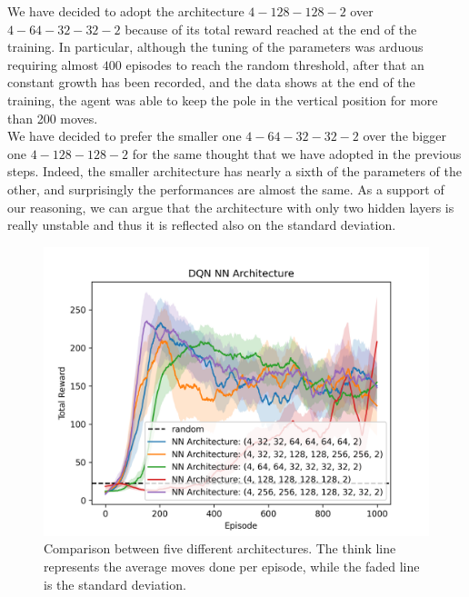 \documentclass{article}
\begin{document}
   We have decided to adopt the architecture $4-128-128-2$ over $4-64-32-32-2$ because of its total reward reached at the end of the training. 
   In particular, although the tuning of the parameters was arduous requiring almost $400$ episodes to reach the random threshold, 
   after that an constant growth has been recorded, and the data shows at the end of the training, the agent was able to keep the pole in the vertical position for more than 200 moves.\\
   We have decided to prefer the smaller one $4-64-32-32-2$ over the bigger one $4-128-128-2$ for the same thought that we have adopted in the previous steps. 
   Indeed, the smaller architecture has nearly a sixth of the parameters of the other, and surprisingly the performances are almost the same. 
   As a support of our reasoning, we can argue that the architecture with only two hidden layers is really unstable and thus it is reflected also on the standard deviation.\\
   
   \begin{figure}[ht!]
      \centering
      \includegraphics[width=\columnwidth]{assets/fig_hp/nn_architecture.png}
      \caption{Comparison between five different architectures. The think line represents the average moves done per episode, while the faded line is the standard deviation. 
      }
      \label{comp_nn_arch}
   \end{figure}
\end{document}
